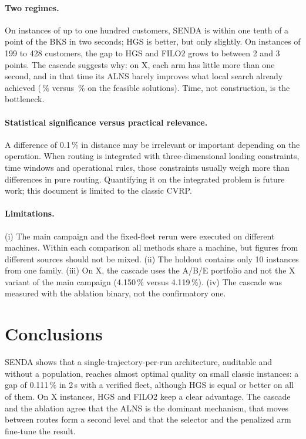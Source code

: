 \documentclass[11pt,a4paper]{article}
\newcommand{\senda}{SENDA}
\begin{document}
\paragraph{Two regimes.} On instances of up to one hundred customers, \senda{} is within one tenth of a
point of the BKS in two seconds; HGS is better, but only slightly. On instances of 199 to 428
customers, the gap to HGS and FILO2 grows to between 2 and 3 points. The cascade suggests why: on X,
each arm has little more than one second, and in that time its ALNS barely improves what local search
already achieved (\cgfXd\,\% versus \cgfXc\,\% on the feasible solutions). Time, not construction, is
the bottleneck.

\paragraph{Statistical significance versus practical relevance.} A difference of 0.1\,\% in distance
may be irrelevant or important depending on the operation. When routing is integrated with
three-dimensional loading constraints, time windows and operational rules, those constraints usually
weigh more than differences in pure routing. Quantifying it on the integrated problem is future work;
this document is limited to the classic CVRP.

\paragraph{Limitations.}
(i) The main campaign and the fixed-fleet rerun were executed on different machines. Within each
comparison all methods share a machine, but figures from different sources should not be mixed.
(ii) The holdout contains only 10 instances from one family.
(iii) On X, the cascade uses the A/B/E portfolio and not the X variant of the main campaign
(4.150\,\% versus 4.119\,\%).
(iv) The cascade was measured with the ablation binary, not the confirmatory one.

\section{Conclusions}
\label{sec:conclusiones}

\senda{} shows that a single-trajectory-per-run architecture, auditable and without a population,
reaches almost optimal quality on small classic instances: a gap of 0.111\,\% in 2\,s with a verified
fleet, although HGS is equal or better on all of them. On X instances, HGS and FILO2 keep a clear
advantage. The cascade and the ablation agree that the ALNS is the dominant mechanism, that moves
between routes form a second level and that the selector and the penalized arm fine-tune the result.
\end{document}
